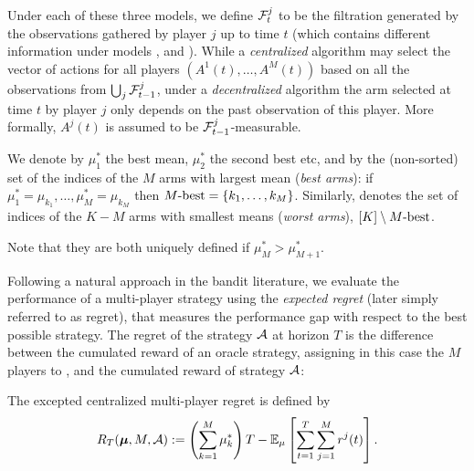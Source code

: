 Under each of these three models, we define $\mathcal{F}^j_t$ to be the filtration generated by the observations gathered by player $j$ up to time $t$ (which contains different information under models \modelun, \modeldeux{} and \modeltrois).
While a \emph{centralized} algorithm may select the vector of actions for all players $(A^1(t),\dots,A^M(t))$ based on all the observations from $\bigcup_j \mathcal{F}^j_{t-1}$, under a \emph{decentralized} algorithm the arm selected at time $t$ by player $j$ only depends on the past observation of this player.
More formally, $A^j(t)$ is assumed to be $\mathcal{F}^j_{t-1}$-measurable.

\begin{definition}\label{def:5:MbestMworst}
\begin{leftbar}[defnbar]  %
  We denote by $\mu_1^*$ the best mean, $\mu_2^*$ the second best etc, and
  by \Mbest{} the (non-sorted) set of the indices of the $M$ arms with largest mean (\emph{best arms}): if $\mu_1^* = \mu_{k_1}, \dots, \mu_M^* = \mu_{k_M}$
  then $M\text{-}\mathrm{best} = \{k_1, \dots, k_M\}$.
  Similarly, \Mworst{} denotes the set of indices of the $K-M$ arms with smallest means (\emph{worst arms}),
  $[K] \setminus M\text{-}\mathrm{best}$.

  Note that they are both uniquely defined if $\mu_M^* > \mu_{M+1}^*$.
\end{leftbar}  %
\end{definition}

Following a natural approach in the bandit literature, we evaluate the performance of a multi-player strategy using the \emph{expected regret} (later simply referred to as regret), that measures the performance gap with respect to the best possible strategy.
The regret of the strategy $\mathcal{A}$ at horizon $T$ is the difference between the cumulated reward of an oracle strategy, assigning in this case the $M$ players to \Mbest,
and the cumulated reward of strategy $\mathcal{A}$:

\begin{definition}
\begin{leftbar}[defnbar]  %
  The excepted centralized multi-player regret is defined by
  \begin{equation}\label{eq:5:regret}
    R_T(\boldsymbol{\mu}, M, \mathcal{A}) := \left(\sum_{k=1}^{M}\mu_k^*\right)T - \mathbb{E}_{\mu}\left[\sum_{t=1}^T\sum_{j=1}^M r^j(t)\right].
  \end{equation}
\end{leftbar}  %
\end{definition}

